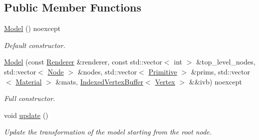 \subsection*{Public Member Functions}
\begin{DoxyCompactItemize}
\item 
\mbox{\label{classblaze_1_1Model_a0c8bd561406e0e56ef33c0072a7a48f6}} 
\hyperlink{classblaze_1_1Model_a0c8bd561406e0e56ef33c0072a7a48f6}{Model} () noexcept
\begin{DoxyCompactList}\small\item\em Default constructor. \end{DoxyCompactList}\item 
\hyperlink{classblaze_1_1Model_a99429577ddc36a20a801f412f12d8b97}{Model} (const \hyperlink{classblaze_1_1Renderer}{Renderer} \&renderer, const std\+::vector$<$ int $>$ \&top\+\_\+level\+\_\+nodes, std\+::vector$<$ \hyperlink{structblaze_1_1Node}{Node} $>$ \&nodes, std\+::vector$<$ \hyperlink{structblaze_1_1Primitive}{Primitive} $>$ \&prims, std\+::vector$<$ \hyperlink{classblaze_1_1Material}{Material} $>$ \&mats, \hyperlink{classblaze_1_1IndexedVertexBuffer}{Indexed\+Vertex\+Buffer}$<$ \hyperlink{structblaze_1_1Vertex}{Vertex} $>$ \&\&ivb) noexcept
\begin{DoxyCompactList}\small\item\em Full constructor. \end{DoxyCompactList}\item 
\mbox{\label{classblaze_1_1Model_a622eb89c06d2adbff32a65c9cf9ba6ce}} 
void \hyperlink{classblaze_1_1Model_a622eb89c06d2adbff32a65c9cf9ba6ce}{update} ()
\begin{DoxyCompactList}\small\item\em Update the transformation of the model starting from the root node. \end{DoxyCompactList}\end{DoxyCompactItemize}
